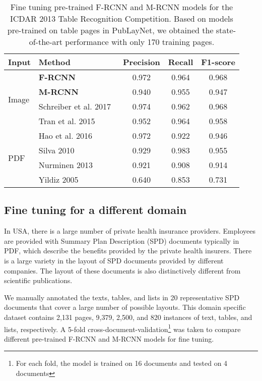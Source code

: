 \documentclass[conference]{IEEEtran}
\begin{document}
\begin{table}[!htb]
  \caption{Fine tuning pre-trained F-RCNN and M-RCNN models for the ICDAR 2013 Table Recognition Competition. Based on models pre-trained on table pages in PubLayNet, we obtained the state-of-the-art performance with only 170 training pages.}
  \label{tab:ICDAR}
  \centering
  \begin{tabular}{llccc}
    \toprule
    Input & Method & Precision & Recall & F1-score \\
    \midrule
    \multirow{4}{*}{Image} &
    \textbf{F-RCNN} & 0.972 & 0.964 & 0.968 \\
    & \textbf{M-RCNN} & 0.940 & 0.955 & 0.947 \\
    & Schreiber et al. 2017~\cite{schreiber2017deepdesrt} & 0.974 & 0.962 & 0.968 \\
    & Tran et al. 2015~\cite{tran2015table} & 0.952 & 0.964 & 0.958 \\
    \midrule
    \multirow{4}{*}{PDF} & Hao et al. 2016~\cite{hao2016table} & 0.972 & 0.922 & 0.946 \\
    & Silva 2010~\cite{silva2010parts} & 0.929 & 0.983 & 0.955 \\
    & Nurminen 2013~\cite{gobel2013icdar} & 0.921 & 0.908 & 0.914 \\
    & Yildiz 2005~\cite{yildiz2005pdf2table} & 0.640 & 0.853 & 0.731 \\
    \bottomrule
\end{tabular}
\end{table}

\subsection{Fine tuning for a different domain}

In USA, there is a large number of private health insurance providers. Employees are provided with Summary Plan Description (SPD) documents typically in PDF, which describe the benefits provided by the private health insurers. There is a large variety in the layout of SPD documents provided by different companies. The layout of these documents is also distinctively different from scientific publications.

We manually annotated the texts, tables, and lists in 20 representative SPD documents that cover a large number of possible layouts. This domain specific dataset contains 2,131 pages, 9,379, 2,500, and 820 instances of text, tables, and lists, respectively. A 5-fold cross-document-validation\footnote{For each fold, the model is trained on 16 documents and tested on 4 documents} was taken to compare different pre-trained F-RCNN and M-RCNN models for fine tuning.
\end{document}
